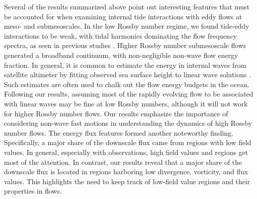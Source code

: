 \documentclass[../Rajarshi-thesis-draft.tex]{subfiles}
\begin{document}
    Several of the results summarized above point out interesting features that must be accounted for when examining internal tide interactions with eddy flows at meso- and submesoscales. In the low Rossby number regime, we found tide-eddy interactions to be weak, with tidal harmonics dominating the flow frequency spectra, as seen in previous studies \citep{buijsman2025, rolland2025}. Higher Rossby number submesoscale flows generated a broadband continuum, with non-negligible non-wave  flow energy  fraction. In general, it is common to estimate the energy in internal waves from satellite altimeter by fitting observed sea surface height to linear wave solutions \citep{Polzin_Lvov_2011,zaron2022}. Such estimates are often used to chalk out the flow energy budgets in the ocean.  Following our results, assuming most of the rapidly evolving flow to be associated with linear waves may be fine at low Rossby numbers, although it will not work for higher Rossby number flows. Our results emphasize the importance of considering non-wave fast motions in understanding the dynamics of high Rossby number flows. The energy flux features formed another noteworthy finding. Specifically, a major share of the downscale flux came from regions with low field values. In general, especially with observations, high field values and regions get most of the attention. In contrast, our results reveal that a major share of the downscale flux is located in regions harboring low divergence, vorticity, and flux values. This highlights the need to keep track of low-field value regions and their properties in flows.


% 
% 

\endgroup
\end{document}
